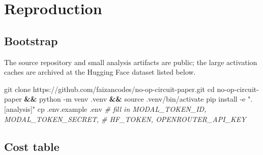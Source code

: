 \documentclass[
  11pt,
  a4paper]{article}
\newenvironment{Shaded}{}{}
\newcommand{\AttributeTok}[1]{\textcolor[rgb]{0.49,0.56,0.16}{#1}}
\newcommand{\BuiltInTok}[1]{\textcolor[rgb]{0.00,0.50,0.00}{#1}}
\newcommand{\CommentTok}[1]{\textcolor[rgb]{0.38,0.63,0.69}{\textit{#1}}}
\newcommand{\ExtensionTok}[1]{#1}
\newcommand{\FunctionTok}[1]{\textcolor[rgb]{0.02,0.16,0.49}{#1}}
\newcommand{\KeywordTok}[1]{\textcolor[rgb]{0.00,0.44,0.13}{\textbf{#1}}}
\newcommand{\NormalTok}[1]{#1}
\newcommand{\StringTok}[1]{\textcolor[rgb]{0.25,0.44,0.63}{#1}}
\begin{document}
\section{Reproduction}\label{reproduction}

\subsection{Bootstrap}\label{bootstrap}

The source repository and small analysis artifacts are public; the large
activation caches are archived at the Hugging Face dataset listed below.

\begin{Shaded}
\begin{Highlighting}[]
\FunctionTok{git}\NormalTok{ clone https://github.com/faizancodes/no{-}op{-}circuit{-}paper.git}
\BuiltInTok{cd}\NormalTok{ no{-}op{-}circuit{-}paper }\KeywordTok{\&\&} \ExtensionTok{python} \AttributeTok{{-}m}\NormalTok{ venv .venv }\KeywordTok{\&\&} \BuiltInTok{source}\NormalTok{ .venv/bin/activate}
\ExtensionTok{pip}\NormalTok{ install }\AttributeTok{{-}e} \StringTok{".[analysis]"}
\FunctionTok{cp}\NormalTok{ .env.example .env }\CommentTok{\# fill in MODAL\_TOKEN\_ID, MODAL\_TOKEN\_SECRET,}
 \CommentTok{\# HF\_TOKEN, OPENROUTER\_API\_KEY}
\end{Highlighting}
\end{Shaded}

\subsection{Cost table}\label{cost-table}
\end{document}
